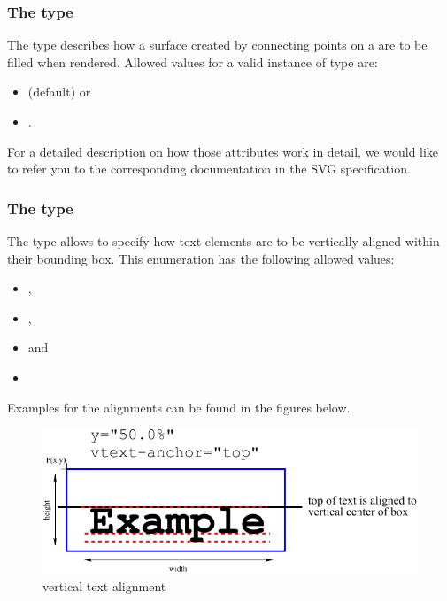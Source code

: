 \subsubsection{The  type}
\label{fillrule-type}
The type  describes how a surface created by connecting 
points on a \Polygon are to be filled when rendered. Allowed values for a valid instance of type  are:

\begin{itemize}
 \item {} (default) or
 \item {}.
\end{itemize}

For a detailed description on how those attributes work in detail, we would like to refer you to the corresponding documentation in the SVG specification. 

\subsubsection{The  type}
\label{vtextanchor-type}
The type  allows to specify how text elements are to be
vertically aligned within their bounding box. This enumeration has the following allowed values: 

\begin{itemize}
 \item {},
 \item {},
 \item {} and
 \item {}
\end{itemize}

Examples for the alignments can be found in the figures below. 

\begin{figure}[!ht]
\begin{center}
\includegraphics[scale=0.60]{figures/VerticalTextPlacement2}
\end{center}
\caption{vertical text alignment }
\label{VerticalTextPlacement2}
\end{figure}

